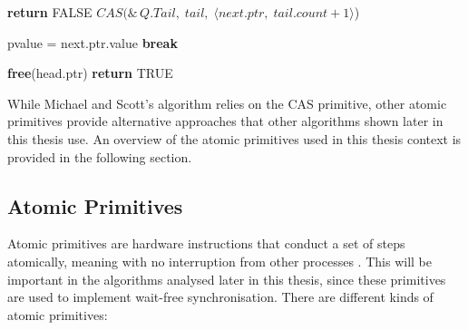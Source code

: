 \begin{algorithm}[!ht]
\begin{algorithmic}[1]
                        \State \textbf{return} FALSE
                    \Else
                        \State 
                        $CAS(\&\,Q.Tail,\; tail,\; \langle next.ptr,\; tail.count+1\rangle$)
                    \EndIf
    
                \Else
                    \State *pvalue = next.ptr.value
                        \State \textbf{break}
                    \EndIf
                \EndIf
            \EndIf
        \EndLoop
    
        \State \textbf{free}(head.ptr)
        \State \textbf{return} TRUE
    
    \EndFunction
    
    \end{algorithmic}
    \cite{MichaelScottQueue}
\end{algorithm} 

While Michael and Scott's algorithm relies on the \ac{CAS} primitive, other atomic primitives provide alternative approaches that other algorithms shown later in this thesis use. An overview of the atomic primitives used in this thesis context is provided in the following section.

\subsection{Atomic Primitives}\label{subsec:atomic-primitives}
Atomic primitives are hardware instructions that conduct a set of steps atomically, meaning with no interruption from other processes \cite{Atomics}. This will be important in the algorithms analysed later in this thesis, since these primitives are used to implement wait-free synchronisation. There are different kinds of atomic primitives: 

